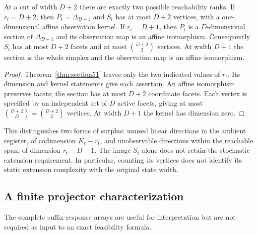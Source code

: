 \begin{corollary}\label{cor:surplus51}
At a cut of width $D+2$ there are exactly two possible reachability
ranks. If $r_t=D+2$, then $P_t=\Delta_{D+1}$ and $S_t$ has at most
$D+2$ vertices, with a one-dimensional affine observation kernel.
If $r_t=D+1$, then $P_t$ is a $D$-dimensional section of
$\Delta_{D+1}$ and its observation map is an affine isomorphism.
Consequently $S_t$ has at most $D+2$ facets and at most
$\binom{D+2}{2}$ vertices. At width $D+1$ the section is the whole
simplex and the observation map is an affine isomorphism.
\end{corollary}
\begin{proof}
Theorem~\ref{thm:section51} leaves only the two indicated values of
$r_t$. Its dimension and kernel statements give each assertion. An
affine isomorphism preserves facets; the section has at most $D+2$
coordinate facets. Each vertex is specified by an independent set of
$D$ active facets, giving at most $\binom{D+2}{D}=\binom{D+2}{2}$
vertices. At width $D+1$ the kernel has dimension zero.
\end{proof}

This distinguishes two forms of surplus: unused linear directions in
the ambient register, of codimension $K_t-r_t$, and unobservable
directions within the reachable span, of dimension $r_t-D-1$.
The image $S_t$ alone does not retain the stochastic extension
requirement. In particular, counting its vertices does not identify
its static extension complexity with the original state width.

\subsection{A finite projector characterization}
The complete suffix-response arrays are useful for interpretation but
are not required as input to an exact feasibility formula.

